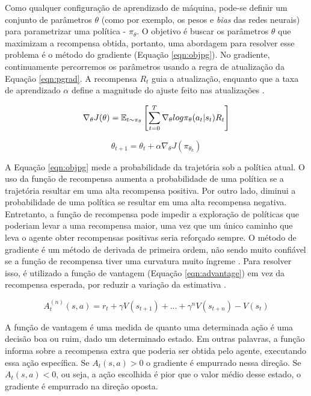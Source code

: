 Como qualquer configuração de aprendizado de máquina, pode-se definir um conjunto de parâmetros $\theta$ (como por exemplo, os pesos e \textit{bias} das redes neurais) para parametrizar uma política - $\pi_{\theta}$. O objetivo é buscar os parâmetros $\theta$ que maximizam a recompensa obtida, portanto, uma abordagem para resolver esse problema é o método do gradiente (Equação \ref{eqn:objpg}). No gradiente, continuamente percorremos os parâmetros usando a regra de atualização da Equação \ref{eqn:pgrad}. A recompensa $R_t$ guia a atualização, enquanto que a taxa de aprendizado $\alpha$ define a magnitude do ajuste feito nas atualizações \cite{sutton-barto98}.

\begin{equation}
\label{eqn:objpg}
\nabla_{\theta}J(\theta) = \operatorname{\mathbb{E}}_{t\sim\pi_{\theta}} \left[\sum^{T}_{t=0}\nabla_{\theta}log\pi_{\theta}(a_t|s_t)R_t\right]
\end{equation}

\begin{equation}
\label{eqn:pgrad}
\theta_{t+1} = \theta_{t} + \alpha \nabla_{\theta} J(\pi_{\theta_k})
\end{equation}

A Equação \ref{eqn:objpg} mede a probabilidade da trajetória sob a política atual. O uso da função de recompensa aumenta a probabilidade de uma política se a trajetória resultar em uma alta recompensa positiva. Por outro lado, diminui a probabilidade de uma política se resultar em uma alta recompensa negativa. Entretanto, a função de recompensa pode impedir a exploração de políticas que poderiam levar a uma recompensa maior, uma vez que um único caminho que leva o agente obter recompensas positivas seria reforçado sempre. O método de gradiente é um método de derivada de primeira ordem, não sendo muito confiável se a função de recompensa tiver uma curvatura muito íngreme \cite{jonathanHuiRL}. Para resolver isso, é utilizado a função de vantagem (Equação \ref{eqn:advantage}) em vez da recompensa esperada, por reduzir a variação da estimativa \cite{jonathanHuiPPO}.

\begin{equation}
\label{eqn:advantage}
A_{t}^{(n)}(s,a) = r_{t} + \gamma V(s_{t+1}) + ... + \gamma^n V(s_{t+n}) - V(s_{t})
\end{equation}

A função de vantagem é uma medida de quanto uma determinada ação é uma decisão boa ou ruim, dado um determinado estado. Em outras palavras, a função informa sobre a recompensa extra que poderia ser obtida pelo agente, executando essa ação específica. Se $A_{t}(s,a) > 0$ o gradiente é empurrado nessa direção. Se $A_{t}(s,a) < 0$, ou seja, a ação escolhida é pior que o valor médio desse estado, o gradiente é empurrado na direção oposta.

